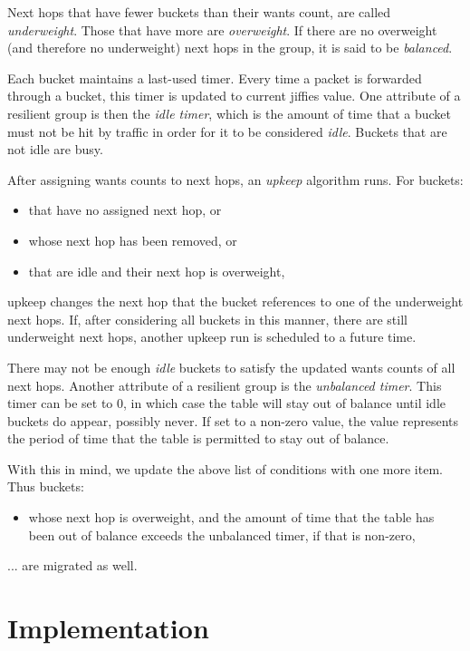 \documentclass[letterpaper]{article}
\begin{document}
Next hops that have fewer buckets than their wants count, are called
\emph{underweight}. Those that have more are \emph{overweight}. If there
are no overweight (and therefore no underweight) next hops in the group, it
is said to be \emph{balanced}.

Each bucket maintains a last-used timer. Every time a packet is forwarded
through a bucket, this timer is updated to current jiffies value. One
attribute of a resilient group is then the \emph{idle timer}, which is the
amount of time that a bucket must not be hit by traffic in order for it to
be considered \emph{idle}. Buckets that are not idle are busy.

After assigning wants counts to next hops, an \emph{upkeep} algorithm runs.
For buckets:

\begin{itemize}
\item that have no assigned next hop, or
\item whose next hop has been removed, or
\item that are idle and their next hop is overweight,
\end{itemize}

upkeep changes the next hop that the bucket references to one of the
underweight next hops. If, after considering all buckets in this manner,
there are still underweight next hops, another upkeep run is scheduled to a
future time.

There may not be enough \emph{idle} buckets to satisfy the updated wants
counts of all next hops. Another attribute of a resilient group is the
\emph{unbalanced timer}. This timer can be set to 0, in which case the
table will stay out of balance until idle buckets do appear, possibly
never. If set to a non-zero value, the value represents the period of time
that the table is permitted to stay out of balance.

With this in mind, we update the above list of conditions with one more
item. Thus buckets:

\begin{itemize}
\item whose next hop is overweight, and the amount of time that the table
  has been out of balance exceeds the unbalanced timer, if that is
  non-zero,
\end{itemize}

... are migrated as well.

\section{Implementation}
\end{document}
